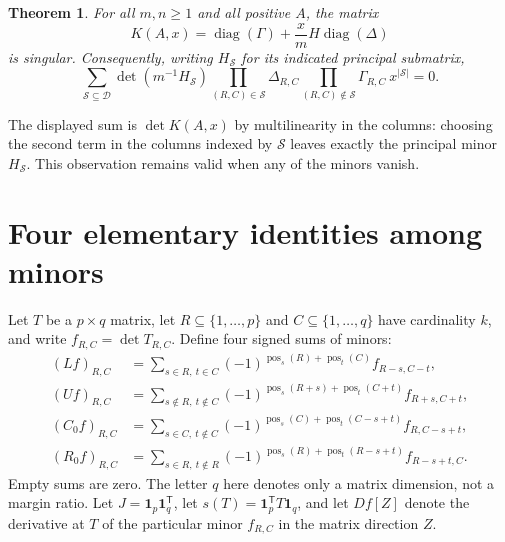 \documentclass[11pt]{article}
\newtheorem{theorem}{Theorem}
\newcommand{\diag}{\operatorname{diag}}
\newcommand{\pos}{\operatorname{pos}}
\newcommand{\D}{\mathcal D}
\newcommand{\one}{\mathbf 1}
\begin{document}
\begin{theorem}\label{thm:main}
For all $m,n\geq1$ and all positive $A$, the matrix
\begin{equation}\label{eq:K}
 K(A,x)=\diag(\Gamma)+\frac{x}{m}H\diag(\Delta)
\end{equation}
is singular. Consequently, writing $H_{\mathcal S}$ for its indicated principal submatrix,
\[
 \sum_{\mathcal S\subseteq\D}\det(m^{-1}H_{\mathcal S})
 \prod_{(R,C)\in\mathcal S}\Delta_{R,C}
 \prod_{(R,C)\notin\mathcal S}\Gamma_{R,C}\ x^{|\mathcal S|}=0.
\]
\end{theorem}
The displayed sum is $\det K(A,x)$ by multilinearity in the columns: choosing the second term in the columns indexed by $\mathcal S$ leaves exactly the principal minor $H_{\mathcal S}$. This observation remains valid when any of the minors vanish.

\section{Four elementary identities among minors}
Let $T$ be a $p\times q$ matrix, let $R\subseteq\{1,\ldots,p\}$ and $C\subseteq\{1,\ldots,q\}$ have cardinality $k$, and write $f_{R,C}=\det T_{R,C}$. Define four signed sums of minors:
\begin{align*}
 (Lf)_{R,C}&=\sum_{s\in R,\ t\in C}
 (-1)^{\pos_s(R)+\pos_t(C)}f_{R-s,C-t},\\
 (Uf)_{R,C}&=\sum_{s\notin R,\ t\notin C}
 (-1)^{\pos_s(R+s)+\pos_t(C+t)}f_{R+s,C+t},\\
 (C_0f)_{R,C}&=\sum_{s\in C,\ t\notin C}
 (-1)^{\pos_s(C)+\pos_t(C-s+t)}f_{R,C-s+t},\\
 (R_0f)_{R,C}&=\sum_{s\in R,\ t\notin R}
 (-1)^{\pos_s(R)+\pos_t(R-s+t)}f_{R-s+t,C}.
\end{align*}
Empty sums are zero. The letter $q$ here denotes only a matrix dimension, not a margin ratio. Let $J=\one_p\one_q^{\mathsf T}$, let $s(T)=\one_p^{\mathsf T}T\one_q$, and let $Df[Z]$ denote the derivative at $T$ of the particular minor $f_{R,C}$ in the matrix direction $Z$.
\end{document}
